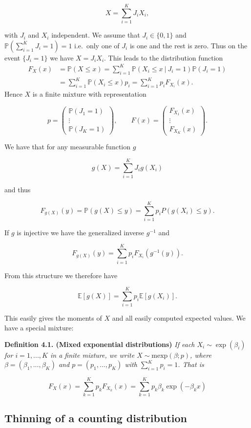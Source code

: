 \documentclass[a4paper,10pt,openany]{book}
\begin{document}
\[
X=\sum_{i=1}^K J_iX_i,
\]

with \(J_i\) and \(X_i\) independent. We assume that \(J_i\in\{0,1\}\) and \(\mathbb P(\sum_{i=1}^K J_i=1)=1\) i.e.~only one of \(J_i\) is one and the rest is zero. Thus on the event \(\{J_i=1\}\) we have \(X=J_iX_i\). This leads to the distribution function
\begin{align*}
F_X(x)&=\mathbb P(X\le x)=\sum_{i=1}^K\mathbb P(X_i\le x\ \vert\ J_i = 1)\mathbb P(J_i=1)\\
&=\sum_{i=1}^K\mathbb P(X_i\le x)p_i=\sum_{i=1}^K p_i F_{X_i}(x).
\end{align*}
Hence \(X\) is a finite mixture with representation

\[
p =
\begin{pmatrix}
\mathbb P(J_1=1)\\
\vdots\\
\mathbb P(J_K=1)
\end{pmatrix},\qquad F(x) =
\begin{pmatrix}
F_{X_1}(x)\\
\vdots\\
F_{X_K}(x)
\end{pmatrix}.
\]

We have that for any measurable function \(g\)

\[
g(X)=\sum_{i=1}^K J_i g(X_i)
\]

and thus

\[
F_{g(X)}(y)=\mathbb P(g(X)\le y)=\sum_{i=1}^K p_iP(g(X_i)\le y).
\]

If \(g\) is injective we have the generalized inverse \(g^{-1}\) and

\[
F_{g(X)}(y)=\sum_{i=1}^K p_i F_{X_i}(g^{-1}(y)).
\]

From this structure we therefore have

\[
\mathbb E[g(X)]=\sum_{i=1}^K p_i\mathbb E[g(X_i)].
\]

This easily gives the moments of \(X\) and all easily computed expected values. We have a special mixture:

\textbf{Definition 4.1. (Mixed exponential distributions)} \emph{If each \(X_i\sim \exp(\beta_i)\) for \(i=1,...,K\) in a finite mixture, we write \(X\sim \text{mexp}(\beta;p)\), where \(\beta=(\beta_1,...,\beta_K)\) and \(p=(p_1,...,p_{K})\) with \(\sum_{i=1}^Kp_i=1\). That is}

\[
F_X(x)=\sum_{k=1}^Kp_k F_{X_k}(x)=\sum_{k=1}^Kp_k\beta_k\exp(-\beta_kx)
\]

\hypertarget{thinning-of-a-counting-distribution}{%
\subsection{Thinning of a counting distribution}\label{thinning-of-a-counting-distribution}}
\end{document}
